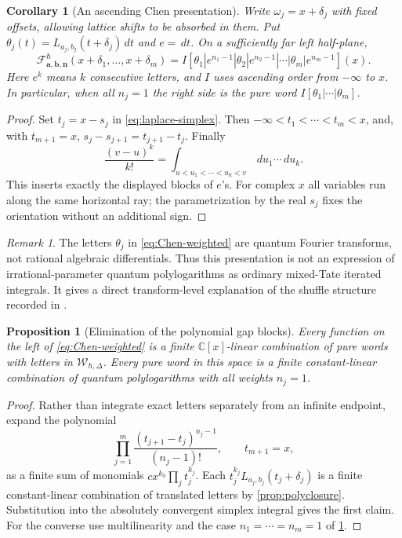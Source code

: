 \documentclass[11pt]{article}
\numberwithin{equation}{section}
\newtheorem{proposition}[proposition]{Proposition}
\newtheorem{corollary}[corollary]{Corollary}
\theoremstyle{definition}
\theoremstyle{remark}
\newtheorem{remark}[remark]{Remark}
\newcommand{\C}{\mathbb C}
\newcommand{\dd}{\,d}
\newcommand{\calF}{\mathcal F}
\newcommand{\calW}{\mathcal W}
\newcommand{\qh}{\hbar}
\begin{document}
\begin{corollary}[An ascending Chen presentation]\label{cor:Chen}
Write $\omega_j=x+\delta_j$ with fixed offsets, allowing lattice shifts to be
absorbed in them. Put $\theta_j(t)=L_{a_j,b_j}(t+\delta_j)\dd t$ and $e=\dd t$.
On a sufficiently far left half-plane,
\begin{equation}\label{eq:Chen-weighted}
 \calF_{\mathbf a,\mathbf b,\mathbf n}^{\qh}
 (x+\delta_1,\ldots,x+\delta_m)
 =I[\theta_1|e^{n_1-1}|\theta_2|e^{n_2-1}|\cdots|
       \theta_m|e^{n_m-1}](x).
\end{equation}
Here $e^k$ means $k$ consecutive letters, and $I$ uses ascending order from
$-\infty$ to $x$. In particular, when all $n_j=1$ the right side is the pure
word $I[\theta_1|\cdots|\theta_m]$.
\end{corollary}
\begin{proof}
Set $t_j=x-s_j$ in \eqref{eq:laplace-simplex}. Then
$-\infty<t_1<\cdots<t_m<x$, and, with $t_{m+1}=x$,
$s_j-s_{j+1}=t_{j+1}-t_j$. Finally
\[
 \frac{(v-u)^k}{k!}
 =\int_{u<u_1<\cdots<u_k<v}\dd u_1\cdots\dd u_k.
\]
This inserts exactly the displayed blocks of $e$'s. For complex $x$ all
variables run along the same horizontal ray; the parametrization by the
real $s_j$ fixes the orientation without an additional sign.
\end{proof}

\begin{remark}
The letters $\theta_j$ in \eqref{eq:Chen-weighted} are quantum Fourier
transforms, not rational algebraic differentials. Thus this presentation is
not an expression of irrational-parameter quantum polylogarithms as ordinary
mixed-Tate iterated integrals. It gives a direct transform-level explanation
of the shuffle structure recorded in \cite[Theorem~3.7]{Goncharov2026}.
\end{remark}

\begin{proposition}[Elimination of the polynomial gap blocks]\label{prop:weight-reduction}
Every function on the left of \eqref{eq:Chen-weighted} is a finite
$\C[x]$-linear combination of pure words with letters in
$\calW_{\qh,\Delta}$. Every pure word in this space is a finite constant-linear
combination of quantum polylogarithms with all weights $n_j=1$.
\end{proposition}
\begin{proof}
Rather than integrate exact letters separately from an infinite endpoint,
expand the polynomial
\[
 \prod_{j=1}^m\frac{(t_{j+1}-t_j)^{n_j-1}}{(n_j-1)!},\qquad t_{m+1}=x,
\]
as a finite sum of monomials $c x^{k_0}\prod_jt_j^{k_j}$.
Each $t_j^{k_j}L_{a_j,b_j}(t_j+\delta_j)$ is a finite constant-linear
combination of translated letters by \cref{prop:polyclosure}. Substitution
into the absolutely convergent simplex integral gives the first claim.
For the converse use multilinearity and the case $n_1=\cdots=n_m=1$ of
\cref{cor:Chen}.
\end{proof}
\end{document}
